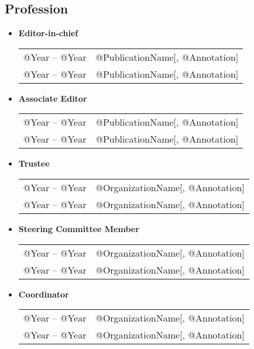 \documentclass[10pt]{article}
\begin{document}
\subsection*{Profession}


\begin{itemize}
\item[] \textbf{Editor-in-chief}
\\[1.3ex]
\begin{tabular}{l@{\quad\ }p{38em}} 
 @Year -- @Year 
 & @PublicationName[, @Annotation]
 \\[.5ex]
 @Year -- @Year 
 & @PublicationName[, @Annotation]
\end{tabular}

\item[] \textbf{Associate Editor}
\\[1.3ex]
\begin{tabular}{l@{\quad\ }p{38em}} 
 @Year -- @Year 
 & @PublicationName[, @Annotation]
 \\[.5ex]
 @Year -- @Year 
 & @PublicationName[, @Annotation]
\end{tabular}

\item[] \textbf{Trustee}
\\[1.3ex]
\begin{tabular}{l@{\quad\ }p{38em}} 
 @Year -- @Year 
 & @OrganizationName[, @Annotation]
 \\[.5ex]
 @Year -- @Year 
 & @OrganizationName[, @Annotation]
\end{tabular}

\item[] \textbf{Steering Committee Member}
\\[1.3ex]
\begin{tabular}{l@{\quad\ }p{38em}} 
 @Year -- @Year 
 & @OrganizationName[, @Annotation]
 \\[.5ex]
 @Year -- @Year 
 & @OrganizationName[, @Annotation]
\end{tabular}

\item[] \textbf{Coordinator}
\\[1.3ex]
\begin{tabular}{l@{\quad\ }p{38em}} 
 @Year -- @Year 
 & @OrganizationName[, @Annotation]
 \\[.5ex]
 @Year -- @Year 
 & @OrganizationName[, @Annotation]
\end{tabular}


\end{itemize}
\end{document}
